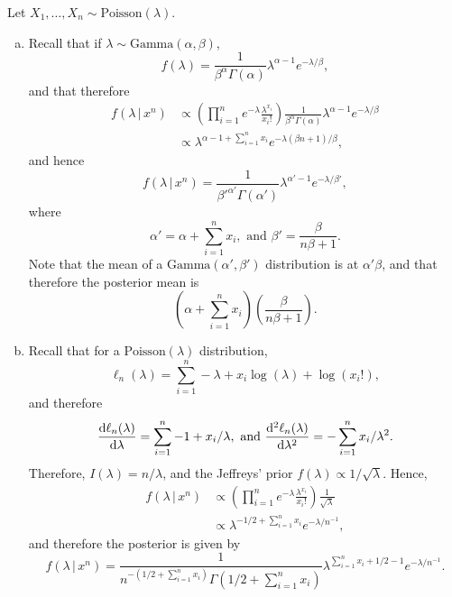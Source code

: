 \begin{ex}
  Let $X_1,\ldots,X_n\sim\text{Poisson}(\lambda)$.
  \begin{enumerate}[(a)]
    \item Recall that if $\lambda\sim\text{Gamma}(\alpha,\beta)$,
          \[
            f(\lambda)=\frac{1}{\beta^\alpha\Gamma(\alpha)}\lambda^{\alpha-1}e^{-\lambda/\beta},
          \]
          and that therefore
          \begin{align*}
            f(\lambda\,|\,x^n)
             & \propto \left(\prod_{i=1}^n e^{-\lambda}\frac{\lambda^{x_i}}{x_i!}\right)
            \frac{1}{\beta^\alpha\Gamma(\alpha)}\lambda^{\alpha-1}e^{-\lambda/\beta}     \\
             & \propto \lambda^{\alpha-1+\sum_{i=1}^nx_i}e^{-\lambda(\beta n+1)/\beta},
          \end{align*}
          and hence
          \[
            f(\lambda\,|\,x^n)
            =\frac{1}{\beta'^{\alpha'}\Gamma(\alpha')}\lambda^{\alpha'-1}e^{-\lambda/\beta'},
          \]
          where
          \[
            \alpha'=\alpha+\sum_{i=1}^nx_i,\text{ and }
            \beta'=\frac{\beta}{n\beta +1}.
          \]
          Note that the mean of a $\text{Gamma}(\alpha', \beta')$ distribution
          is at $\alpha'\beta$, and that therefore the posterior mean is
          \[
            \left(\alpha+\sum_{i=1}^nx_i\right)
            \left(\frac{\beta}{n\beta +1}\right).
          \]
    \item Recall that for a $\text{Poisson}(\lambda)$ distribution,
          \[
            \ell_n(\lambda)=\sum_{i=1}^n-\lambda+x_i\log(\lambda)+\log(x_i!),
          \]
          and therefore
          \[
            \frac{\mathrm{d}\ell_n(\lambda)}{\mathrm{d}\lambda}
            =\sum_{i=1}^n-1+x_i/\lambda,
            \text{ and  }
            \frac{\mathrm{d}^2\ell_n(\lambda)}{\mathrm{d}\lambda^2}
            =-\sum_{i=1}^n x_i/\lambda^2.
          \]
          Therefore, $I(\lambda)=n/\lambda$, and the Jeffreys' prior
          $f(\lambda)\propto 1/\sqrt{\lambda}$. Hence,
          \begin{align*}
            f(\lambda\,|\,x^n)
             & \propto \left(\prod_{i=1}^n e^{-\lambda}\frac{\lambda^{x_i}}{x_i!}\right)\frac{1}{\sqrt{\lambda}} \\
             & \propto \lambda^{-1/2+\sum_{i=1}^n x_i}e^{-\lambda/n^{-1}},
          \end{align*}
          and therefore the posterior is given by
          \[
            f(\lambda\,|\,x^n)
            =\frac{1}{n^{-(1/2+\sum_{i=1}^nx_i)}\Gamma(1/2+\sum_{i=1}^nx_i)}\lambda^{\sum_{i=1}^nx_i+1/2-1}e^{-\lambda/n^{-1}}.
          \]
  \end{enumerate}
\end{ex}

